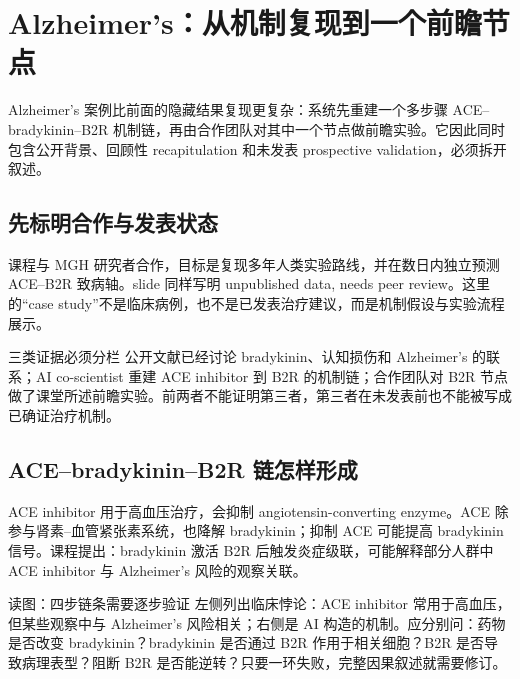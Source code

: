 \section{Alzheimer's：从机制复现到一个前瞻节点}

Alzheimer's 案例比前面的隐藏结果复现更复杂：系统先重建一个多步骤 ACE--bradykinin--B2R 机制链，再由合作团队对其中一个节点做前瞻实验。它因此同时包含公开背景、回顾性 recapitulation 和未发表 prospective validation，必须拆开叙述。

\subsection{先标明合作与发表状态}

课程与 MGH 研究者合作，目标是复现多年人类实验路线，并在数日内独立预测 ACE--B2R 致病轴。slide 同样写明 unpublished data, needs peer review。这里的“case study”不是临床病例，也不是已发表治疗建议，而是机制假设与实验流程展示。


\begin{warningbox}{三类证据必须分栏}
公开文献已经讨论 bradykinin、认知损伤和 Alzheimer’s 的联系；AI co-scientist 重建 ACE inhibitor 到 B2R 的机制链；合作团队对 B2R 节点做了课堂所述前瞻实验。前两者不能证明第三者，第三者在未发表前也不能被写成已确证治疗机制。
\end{warningbox}

\subsection{ACE--bradykinin--B2R 链怎样形成}

ACE inhibitor 用于高血压治疗，会抑制 angiotensin-converting enzyme。ACE 除参与肾素--血管紧张素系统，也降解 bradykinin；抑制 ACE 可能提高 bradykinin 信号。课程提出：bradykinin 激活 B2R 后触发炎症级联，可能解释部分人群中 ACE inhibitor 与 Alzheimer’s 风险的观察关联。


\begin{knowledgebox}{读图：四步链条需要逐步验证}
左侧列出临床悖论：ACE inhibitor 常用于高血压，但某些观察中与 Alzheimer’s 风险相关；右侧是 AI 构造的机制。应分别问：药物是否改变 bradykinin？bradykinin 是否通过 B2R 作用于相关细胞？B2R 是否导致病理表型？阻断 B2R 是否能逆转？只要一环失败，完整因果叙述就需要修订。
\end{knowledgebox}


